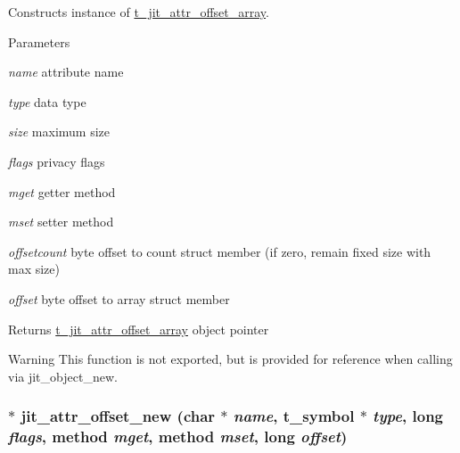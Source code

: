 Constructs instance of \hyperlink{structt__jit__attr__offset__array}{t\_\-jit\_\-attr\_\-offset\_\-array}. 
\begin{DoxyParams}{Parameters}
\item[{\em name}]attribute name \item[{\em type}]data type \item[{\em size}]maximum size \item[{\em flags}]privacy flags \item[{\em mget}]getter method \item[{\em mset}]setter method \item[{\em offsetcount}]byte offset to count struct member (if zero, remain fixed size with max size) \item[{\em offset}]byte offset to array struct member\end{DoxyParams}
\begin{DoxyReturn}{Returns}
\hyperlink{structt__jit__attr__offset__array}{t\_\-jit\_\-attr\_\-offset\_\-array} object pointer
\end{DoxyReturn}
\begin{DoxyWarning}{Warning}
This function is not exported, but is provided for reference when calling via jit\_\-object\_\-new. 
\end{DoxyWarning}
\hypertarget{group__attrmod_gaf1539159e0a0bb0238b2cf9b03ac3308}{
\subsubsection[{jit\_\-attr\_\-offset\_\-new}]{ $\ast$ jit\_\-attr\_\-offset\_\-new (char $\ast$ {\em name}, \/  {\bf t\_\-symbol} $\ast$ {\em type}, \/  long {\em flags}, \/  {\bf method} {\em mget}, \/  {\bf method} {\em mset}, \/  long {\em offset})}}
\label{group__attrmod_gaf1539159e0a0bb0238b2cf9b03ac3308}


